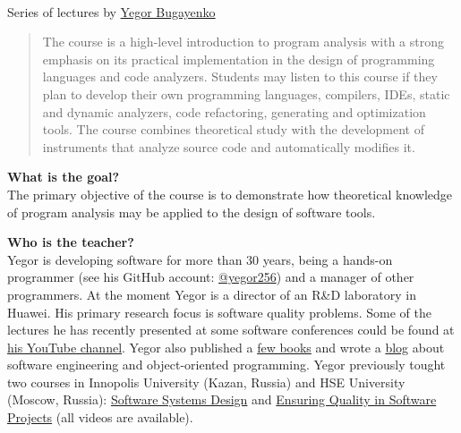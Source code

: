\documentclass[nobrand,anonymous,nodate,nosecurity]{huawei}
\begin{document}
{\\
Series of lectures by \href{https://www.yegor256.com}{Yegor Bugayenko}


\begin{abstract}
The course is a high-level introduction to program analysis with a
strong emphasis on its practical implementation in the design of programming languages
and code analyzers. Students may listen to this
course if they plan to develop their own programming languages,
compilers, IDEs, static and dynamic analyzers, code refactoring, generating and optimization tools.
The course combines theoretical study with the development of
instruments that analyze source code and automatically modifies it.
\end{abstract}


\textbf{What is the goal?}\\
The primary objective of the course is to demonstrate
how theoretical knowledge of program analysis may be applied to
the design of software tools.

\textbf{Who is the teacher?}\\
Yegor is developing software for more than 30 years, being a hands-on programmer
(see his GitHub account: \href{https://github.com/yegor256}{@yegor256})
and a manager of other programmers. At the moment Yegor is a director
of an R\&D laboratory in Huawei. His primary research focus is
software quality problems. Some of the lectures he has recently presented
at some software conferences could be found at
\href{https://www.youtube.com/channel/UCr9qCdqXLm2SU0BIs6d_68Q}{his YouTube channel}.
Yegor also published a \href{https://www.yegor256.com/books.html}{few books}
and wrote a \href{https://www.yegor256.com/contents.html}{blog} about software engineering
and object-oriented programming.
Yegor previously tought two courses in
Innopolis University (Kazan, Russia)
and HSE University (Moscow, Russia):
\href{https://github.com/yegor256/ssd16}{Software Systems Design}
and
\href{https://github.com/yegor256/eqsp}{Ensuring Quality in Software Projects}
(all videos are available).

}
\end{document}
